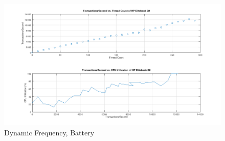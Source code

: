 \documentclass[prb,preprint]{revtex4-1}
\begin{document}
\begin{figure}
\centering
\includegraphics[width=10in]{DynamicBattery.png}
\caption{Dynamic Frequency, Battery}
\label{fig1}
\end{figure}
\end{document}
